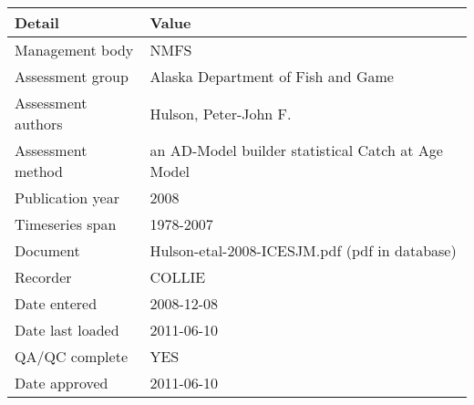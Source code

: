 \begin{table}[htb]
\centering
\begin{tabular}{lp{7cm}}
\toprule
Detail & Value \\
\midrule
Management body    & NMFS                                               \\
Assessment group   & Alaska Department of Fish and Game                 \\
Assessment authors & Hulson, Peter-John F.                              \\
Assessment method  & an AD-Model builder statistical Catch at Age Model \\
Publication year   & 2008                                               \\
Timeseries span    & 1978-2007                                          \\
Document           & Hulson-etal-2008-ICESJM.pdf (pdf in database)      \\
Recorder           & COLLIE                                             \\
Date entered       & 2008-12-08                                         \\
Date last loaded   & 2011-06-10                                         \\
QA/QC complete     & YES                                                \\
Date approved      & 2011-06-10                                         \\
\bottomrule
\end{tabular}
\label{tab:assessdet}
\end{table}
